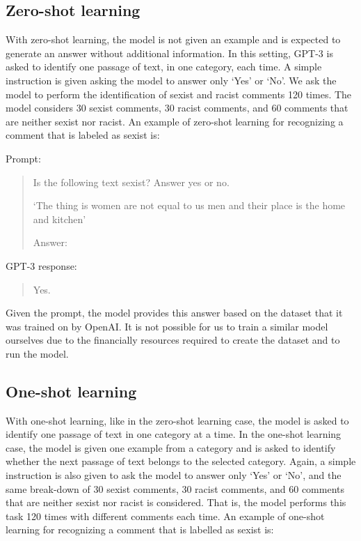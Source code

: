 \documentclass{bmcart}
\begin{document}
\subsection{Zero-shot learning}\label{zero-shot-learning}

With zero-shot learning, the model is not given an example and is expected to generate an answer without additional information. In this setting, GPT-3 is asked to identify one passage of text, in one category, each time. A simple instruction is given asking the model to answer only `Yes' or `No'. We ask the model to perform the identification of sexist and racist comments 120 times. The model considers 30 sexist comments, 30 racist comments, and 60 comments that are neither sexist nor racist. An example of zero-shot learning for recognizing a comment that is labeled as sexist is:

Prompt:

\begin{quote}
Is the following text sexist? Answer yes or no.

`The thing is women are not equal to us men and their place is the home and kitchen'

Answer:
\end{quote}

GPT-3 response:

\begin{quote}
Yes.
\end{quote}

Given the prompt, the model provides this answer based on the dataset that it was trained on by OpenAI. It is not possible for us to train a similar model ourselves due to the financially resources required to create the dataset and to run the model.

\subsection{One-shot learning}\label{one-shot-learning}

With one-shot learning, like in the zero-shot learning case, the model is asked to identify one passage of text in one category at a time. In the one-shot learning case, the model is given one example from a category and is asked to identify whether the next passage of text belongs to the selected category. Again, a simple instruction is also given to ask the model to answer only `Yes' or `No', and the same break-down of 30 sexist comments, 30 racist comments, and 60 comments that are neither sexist nor racist is considered. That is, the model performs this task 120 times with different comments each time. An example of one-shot learning for recognizing a comment that is labelled as sexist is:
\end{document}
